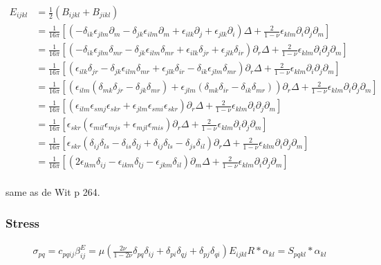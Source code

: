 \documentclass[10pt]{report}
\begin{document}
{\begin{align}
E_{ijkl}&=\frac{1}{2}\left(B_{ijkl}+B_{jikl}\right)\nonumber\\
&=\frac{1}{16\pi}\left[\left(-\delta_{ik}\epsilon_{jlm}\partial_m-\delta_{jk}\epsilon_{ilm}\partial_m+\epsilon_{ilk}\partial_j+\epsilon_{jlk}\partial_i\right)\Delta+\frac{2}{1-\nu}\epsilon_{klm}\partial_i\partial_j\partial_m\right]\nonumber\\
&=\frac{1}{16\pi}\left[\left(-\delta_{ik}\epsilon_{jlm}\delta_{mr}-\delta_{jk}\epsilon_{ilm}\delta_{mr}+\epsilon_{ilk}\delta_{jr}+\epsilon_{jlk}\delta_{ir}\right)\partial_r\Delta+\frac{2}{1-\nu}\epsilon_{klm}\partial_i\partial_j\partial_m\right]\nonumber\\
&=\frac{1}{16\pi}\left[\left(\epsilon_{ilk}\delta_{jr}-\delta_{jk}\epsilon_{ilm}\delta_{mr}+\epsilon_{jlk}\delta_{ir}-\delta_{ik}\epsilon_{jlm}\delta_{mr}\right)\partial_r\Delta+\frac{2}{1-\nu}\epsilon_{klm}\partial_i\partial_j\partial_m\right]\nonumber\\
&=\frac{1}{16\pi}\left[\left(\epsilon_{ilm}(\delta_{mk}\delta_{jr}-\delta_{jk}\delta_{mr})+\epsilon_{jlm}(\delta_{mk}\delta_{ir}-\delta_{ik}\delta_{mr})\right)\partial_r\Delta+\frac{2}{1-\nu}\epsilon_{klm}\partial_i\partial_j\partial_m\right]\nonumber\\
&=\frac{1}{16\pi}\left[\left(\epsilon_{ilm}\epsilon_{smj}\epsilon_{skr}+\epsilon_{jlm}\epsilon_{smi}\epsilon_{skr}\right)\partial_r\Delta+\frac{2}{1-\nu}\epsilon_{klm}\partial_i\partial_j\partial_m\right]\nonumber\\
&=\frac{1}{16\pi}\left[\epsilon_{skr}\left(\epsilon_{mil}\epsilon_{mjs}+\epsilon_{mjl}\epsilon_{mis}\right)\partial_r\Delta+\frac{2}{1-\nu}\epsilon_{klm}\partial_i\partial_j\partial_m\right]\nonumber\\
&=\frac{1}{16\pi}\left[\epsilon_{skr}\left(\delta_{ij}\delta_{ls}-\delta_{is}\delta_{lj}+\delta_{ij}\delta_{ls}-\delta_{js}\delta_{il}\right)\partial_r\Delta+\frac{2}{1-\nu}\epsilon_{klm}\partial_i\partial_j\partial_m\right]\nonumber\\
&=\frac{1}{16\pi}\left[\left(2\epsilon_{lkm}\delta_{ij}-\epsilon_{ikm}\delta_{lj}-\epsilon_{jkm}\delta_{il}\right)\partial_m\Delta+\frac{2}{1-\nu}\epsilon_{klm}\partial_i\partial_j\partial_m\right]\nonumber\\
\end{align}

same as de Wit p 264.

\subsubsection{Stress}
\begin{align}
\sigma_{pq}=c_{pqij}\beta^E_{ij}=
\mu\left(\frac{2\nu}{1-2\nu}\delta_{pq}\delta_{ij}+\delta_{pi}\delta_{qj}+\delta_{pj}\delta_{qi}\right)E_{ijkl}R*\alpha_{kl}=S_{pqkl}*\alpha_{kl}
\end{align}

}
\end{document}
